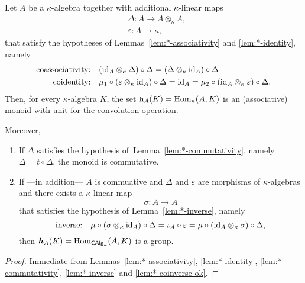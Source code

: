 \begin{thm}\label{thm:co-properties}
    Let\/ $A$ be a $\kappa$-algebra together with additional\/ $\kappa$-linear maps
    $$
    \begin{aligned}
        &\Delta\colon A\to A\otimes_\kappa A, \\
        &\varepsilon\colon A\to\kappa,
    \end{aligned}
    $$
    that satisfy the hypotheses of\/ \textrm{\rm Lemmas~\ref{lem:*-associativity} and \ref{lem:*-identity}}, namely
    \begin{align*}
        \text{\rm coassociativity:}\quad
            &(\text{\rm id}_A\otimes_\kappa\Delta)\circ\Delta
                = (\Delta\otimes_\kappa\text{\rm id}_A)\circ\Delta\\
        \text{\rm coidentity:}\quad
            &\mu_1\circ(\varepsilon\otimes_\kappa\text{\rm id}_A)
                \circ\Delta
                = \text{\rm id}_A
                = \mu_2\circ(\text{\rm id}_A\otimes_\kappa\varepsilon)
                \circ\Delta.
    \end{align*}
    \normalsize
    Then, for every\/ $\kappa$-algebra\/ $K$, the set\/ $\mathtt h_A(K)={\rm Hom}_\kappa(A,K)$ is an (associative) monoid with unit for the convolution operation.

    Moreover,
    \begin{enumerate}[\rm a)]
        \item If\/ $\Delta$ satisfies the hypothesis of\/~\textrm{\rm Lemma~\ref{lem:*-commutativity}}, namely\/ $\Delta=t\circ\Delta$, the monoid is commutative.
    
        \item If ---in addition--- $A$ is commuative and $\Delta$ and\/ $\varepsilon$ are morphisms of\/ $\kappa$-algebras and there exists a\/ $\kappa$-linear map
        $$
            \sigma\colon A\to A
        $$
        that satisfies the hypothesis of\/ \textrm{\rm Lemma~\ref{lem:*-inverse}}, namely
        $$
            \text{\rm inverse:}\quad
                \mu\circ(\sigma\otimes_\kappa\text{\rm id}_A)\circ\Delta
                = \iota_A\circ\varepsilon
                = \mu\circ(\text{\rm id}_A\otimes_\kappa\sigma)\circ\Delta,
        $$
        then\/ $\textrm{\boldmath$\mathit h$}_A(K)={\rm Hom}_{\mathsf{CAlg}_\kappa}(A,K)$ is a group.
    \end{enumerate}
\end{thm}

\begin{proof}
    Immediate from Lemmas~\ref{lem:*-associativity}, \ref{lem:*-identity}, \ref{lem:*-commutativity}, \ref{lem:*-inverse} and \ref{lem:*-coinverse-ok}.
\end{proof}

